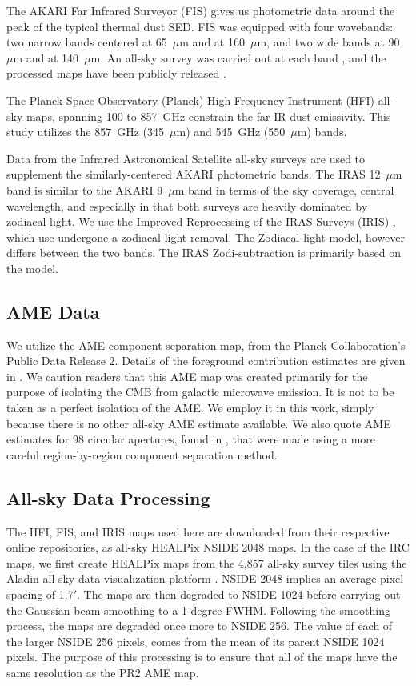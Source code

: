 \documentclass[preprint2,longabstract]{aastex}
\begin{document}
    The AKARI Far Infrared Surveyor (FIS) gives us photometric data around the peak of the typical thermal dust SED. FIS was equipped with four wavebands: two narrow bands centered at 65~$\mu$m and at 160~$\mu$m, and two wide bands at 90~$\mu$m and at 140~$\mu$m. An all-sky survey was carried out at each band \citep{kawada07}, and the processed maps have been publicly released \citep{doi15}.

     The Planck Space Observatory (Planck) High Frequency Instrument (HFI) all-sky maps, spanning 100 to 857~GHz \citep{hfi14viii} constrain the far IR dust emissivity. This study utilizes the 857~GHz (345~$\mu$m) and 545~GHz (550~$\mu$m) bands.

     Data from the Infrared Astronomical Satellite \citep{iras84} all-sky surveys are used to supplement the similarly-centered AKARI photometric bands. The IRAS 12~$\mu$m band is similar to the AKARI 9~$\mu$m band in terms of the sky coverage, central wavelength, and especially in that both surveys are heavily dominated by zodiacal light. We use the Improved Reprocessing of the IRAS Surveys (IRIS) \citep{iris05}, which use undergone a zodiacal-light removal. The Zodiacal light model, however differs between the two bands. The IRAS Zodi-subtraction is primarily based on the \cite{kelsall98} model.

\subsection{AME Data}
     We utilize the AME component separation map, from the Planck Collaboration's Public Data Release 2. Details of the foreground contribution estimates are given in \cite{planckXII}. We caution readers that this AME map was created primarily for the purpose of isolating the CMB from galactic microwave emission. It is not to be taken as a perfect isolation of the AME. We employ it in this work, simply because there is no other all-sky AME estimate available. We also quote AME estimates for 98 circular apertures, found in \cite{planckXV}, that were made using a more careful region-by-region component separation method.

\subsection{All-sky Data Processing}

      The HFI, FIS, and IRIS maps used here are downloaded from their respective online repositories, as all-sky HEALPix \citep{gorski15} NSIDE 2048 maps. In the case of the IRC maps, we first create HEALPix maps from the 4,857 all-sky survey tiles using the Aladin all-sky data visualization platform \citep{bonnarel00}. NSIDE 2048 implies an average pixel spacing of 1.7$'$. The maps are then degraded to NSIDE 1024 before carrying out the Gaussian-beam smoothing to a 1-degree FWHM. Following the smoothing process, the maps are degraded once more to NSIDE 256. The value of each of the larger NSIDE 256 pixels, comes from the mean of its parent NSIDE 1024 pixels. The purpose of this processing is to ensure that all of the maps have the same resolution as the PR2 AME map.
\end{document}
